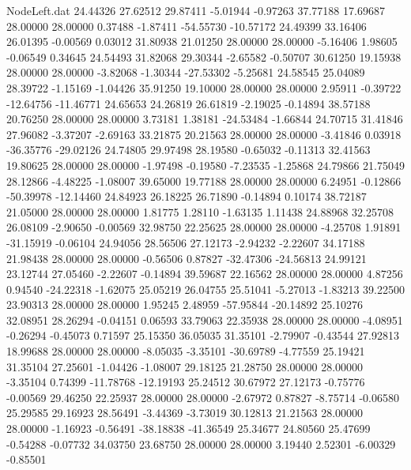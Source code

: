 \begin{filecontents}{NodeLeft.dat}
  24.44326   27.62512   29.87411    -5.01944   -0.97263   37.77188   17.69687   28.00000   28.00000    0.37488   -1.87411  -54.55730  -10.57172
  24.49399   33.16406   26.01395    -0.00569    0.03012   31.80938   21.01250   28.00000   28.00000   -5.16406    1.98605   -0.06549    0.34645
  24.54493   31.82068   29.30344    -2.65582   -0.50707   30.61250   19.15938   28.00000   28.00000   -3.82068   -1.30344  -27.53302   -5.25681
  24.58545   25.04089   28.39722    -1.15169   -1.04426   35.91250   19.10000   28.00000   28.00000    2.95911   -0.39722  -12.64756  -11.46771
  24.65653   24.26819   26.61819    -2.19025   -0.14894   38.57188   20.76250   28.00000   28.00000    3.73181    1.38181  -24.53484   -1.66844
  24.70715   31.41846   27.96082    -3.37207   -2.69163   33.21875   20.21563   28.00000   28.00000   -3.41846    0.03918  -36.35776  -29.02126
  24.74805   29.97498   28.19580    -0.65032   -0.11313   32.41563   19.80625   28.00000   28.00000   -1.97498   -0.19580   -7.23535   -1.25868
  24.79866   21.75049   28.12866    -4.48225   -1.08007   39.65000   19.77188   28.00000   28.00000    6.24951   -0.12866  -50.39978  -12.14460
  24.84923   26.18225   26.71890    -0.14894    0.10174   38.72187   21.05000   28.00000   28.00000    1.81775    1.28110   -1.63135    1.11438
  24.88968   32.25708   26.08109    -2.90650   -0.00569   32.98750   22.25625   28.00000   28.00000   -4.25708    1.91891  -31.15919   -0.06104
  24.94056   28.56506   27.12173    -2.94232   -2.22607   34.17188   21.98438   28.00000   28.00000   -0.56506    0.87827  -32.47306  -24.56813
  24.99121   23.12744   27.05460    -2.22607   -0.14894   39.59687   22.16562   28.00000   28.00000    4.87256    0.94540  -24.22318   -1.62075
  25.05219   26.04755   25.51041    -5.27013   -1.83213   39.22500   23.90313   28.00000   28.00000    1.95245    2.48959  -57.95844  -20.14892
  25.10276   32.08951   28.26294    -0.04151    0.06593   33.79063   22.35938   28.00000   28.00000   -4.08951   -0.26294   -0.45073    0.71597
  25.15350   36.05035   31.35101    -2.79907   -0.43544   27.92813   18.99688   28.00000   28.00000   -8.05035   -3.35101  -30.69789   -4.77559
  25.19421   31.35104   27.25601    -1.04426   -1.08007   29.18125   21.28750   28.00000   28.00000   -3.35104    0.74399  -11.78768  -12.19193
  25.24512   30.67972   27.12173    -0.75776   -0.00569   29.46250   22.25937   28.00000   28.00000   -2.67972    0.87827   -8.75714   -0.06580
  25.29585   29.16923   28.56491    -3.44369   -3.73019   30.12813   21.21563   28.00000   28.00000   -1.16923   -0.56491  -38.18838  -41.36549
  25.34677   24.80560   25.47699    -0.54288   -0.07732   34.03750   23.68750   28.00000   28.00000    3.19440    2.52301   -6.00329   -0.85501

\end{filecontents}
